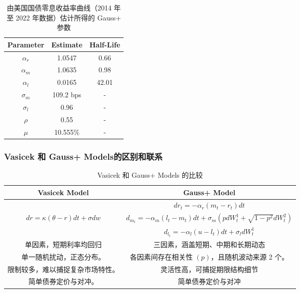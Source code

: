 \begin{itemize}
\begin{itemize}
    \end{itemize}
    
    \begin{table}[h]
        \centering
        \begin{tabular}{@{}ccc@{}}
            \toprule
            Parameter & Estimate & Half-Life \\ \midrule
            \( \alpha_r \) & 1.0547 & 0.66 \\
            \( \alpha_m \) & 1.0635 & 0.98 \\
            \( \alpha_l \) & 0.0165 & 42.01 \\
            \( \sigma_m \) & 109.2 bps & - \\
            \( \sigma_l \) & 0.96 & - \\
            \( \rho \) & 0.55 & - \\
            \( \mu \) & 10.555\% & - \\ \bottomrule
        \end{tabular}
        \caption{由美国国债零息收益率曲线（2014 年至 2022 年数据）估计所得的 Gauss+ 参数}
    \end{table}

\end{itemize}


\subsubsection{Vasicek 和 Gauss+ Models的区别和联系}
\renewcommand{\arraystretch}{1.5}  %

\begin{table}[h]
    \centering
    \begin{tabular}{|c|c|} 
        \hline
        \textbf{Vasicek Model} & \textbf{Gauss+ Model} \\ 
        \hline
       & \( d{r_t} = -\alpha_r(m_t - r_t)dt \) \\ 
       
    \( dr = \kappa(\theta - r)dt + \sigma dw \) & \( d_{m_t} = -\alpha_m(l_t - m_t)dt + \sigma_m\left(p dW_t^1 + \sqrt{1 - p^2} dW_t^2\right) \) \\ & \( d_{l_t} = -\alpha_l(u - l_t)dt + \sigma_l dW_t^1 \) \\ 
        \hline
        单因素，短期利率均回归 & 三因素，涵盖短期、中期和长期动态 \\ 
        \hline

        单一随机扰动，正态分布。&各因素间存在相关性 \( (p) \)，且随机波动来源 2 个。\\  \hline
        限制较多，难以捕捉复杂市场特性。&灵活性高，可捕捉期限结构细节\\  \hline
        简单债券定价与对冲。&简单债券定价与对冲\\  \hline
    \end{tabular}
    \caption{Vasicek 和 Gauss+ Models 的比较}
\end{table}
